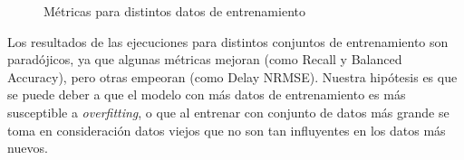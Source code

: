 \begin{figure}
\begin{center}
\end{center}
\caption{M\'etricas para distintos datos de entrenamiento}
\label{table:metrics}
\end{figure}

Los resultados de las ejecuciones para distintos conjuntos de entrenamiento son parad\'ojicos, ya
que algunas m\'etricas mejoran (como Recall y Balanced Accuracy), pero otras empeoran
(como Delay NRMSE). Nuestra hip\'otesis es que se puede deber a que el modelo con m\'as datos
de entrenamiento es m\'as susceptible a \textit{overfitting}, o que al entrenar con conjunto de datos
m\'as grande se toma en consideraci\'on datos viejos que no son tan influyentes en los datos m\'as nuevos.

